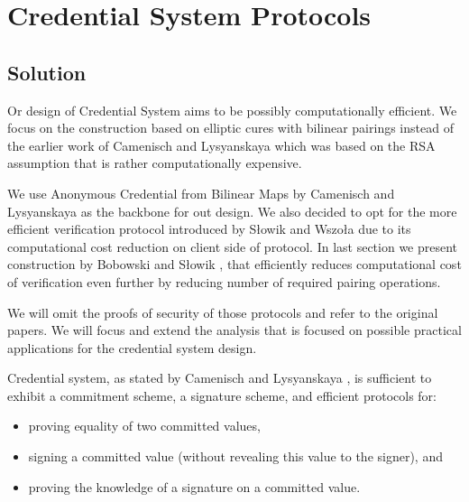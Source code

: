 \chapter{Credential System Protocols}
\thispagestyle{chapterBeginStyle}

\section{Solution}
Or design of Credential System aims to be possibly computationally efficient. We focus on the construction based on elliptic cures with bilinear pairings instead of the earlier work of Camenisch and Lysyanskaya \cite{anoncreds-rsa} which was based on the RSA assumption that is rather computationally expensive.

We use Anonymous Credential from Bilinear Maps by Camenisch and Lysyanskaya \cite{anon-creds-cl04} as the backbone for out design. We also decided to opt for the more efficient verification protocol introduced by Słowik and Wszoła \cite{slowik-efficient-cl-lrsw} due to its computational cost reduction on client side of protocol. In last section we present construction by Bobowski and Słowik \cite{complexity-reduction-bobowski}, that efficiently reduces computational cost of verification even further by reducing number of required pairing operations.

We will omit the proofs of security of those protocols and refer to the original papers. We will focus and extend the analysis that is focused on possible practical applications for the credential system design. 

\begin{remark}
Credential system, as stated by Camenisch and Lysyanskaya \cite{signature-scheme-with-efficient-protocols}, is sufficient to exhibit a commitment scheme, a signature scheme, and efficient protocols for:
\begin{itemize}
    \item proving equality of two committed values,
    \item signing a committed value (without revealing this value to the signer), and
    \item proving the knowledge of a signature on a committed value.
\end{itemize}
\end{remark}


